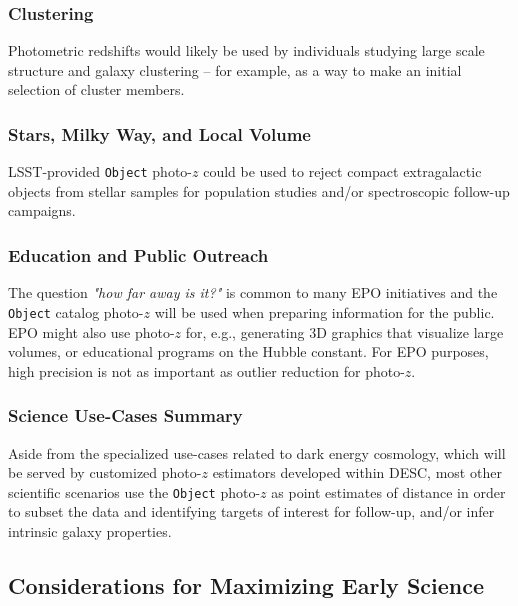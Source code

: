 \documentclass[DM,lsstdraft,toc]{lsstdoc}
\begin{document}
\subsubsection{Clustering}\label{sssec:use_sci_clust}
Photometric redshifts would likely be used by individuals studying large scale structure and galaxy clustering -- for example, as a way to make an initial selection of cluster members.

\subsubsection{Stars, Milky Way, and Local Volume}\label{sssec:use_sci_smwlv}
LSST-provided {\tt Object} photo-$z$ could be used to reject compact extragalactic objects from stellar samples for population studies and/or spectroscopic follow-up campaigns.

\subsubsection{Education and Public Outreach}\label{sssec:use_sci_epo}
The question {\it "how far away is it?"} is common to many EPO initiatives and the {\tt Object} catalog photo-$z$ will be used when preparing information for the public.
EPO might also use photo-$z$ for, e.g., generating 3D graphics that visualize large volumes, or educational programs on the Hubble constant.
For EPO purposes, high precision is not as important as outlier reduction for photo-$z$.


\subsubsection{Science Use-Cases Summary}\label{sssec:use_sci_sum}
Aside from the specialized use-cases related to dark energy cosmology, which will be served by customized photo-$z$ estimators developed within DESC, most other scientific scenarios use the {\tt Object} photo-$z$ as point estimates of distance in order to subset the data and identifying targets of interest for follow-up, and/or infer intrinsic galaxy properties.

\subsection{Considerations for Maximizing Early Science}\label{ssec:use_LOY1}
\end{document}
